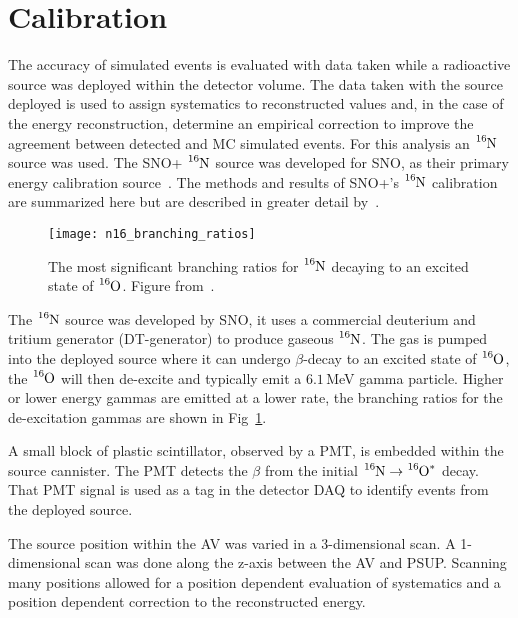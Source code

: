 \section{Calibration}
\label{sec:calib}
The accuracy of simulated events is evaluated with data taken while a
radioactive source was deployed within the detector volume.
The data taken with the source deployed is used to assign systematics to reconstructed
values and, in the case of the energy reconstruction, determine an empirical
correction to improve the agreement between detected and MC simulated events.
For this analysis an $\ce{^{16}N}$ source was used.
The SNO+ $\ce{^{16}N}$ source was developed for SNO, as
their primary energy calibration source~\citep{sno_n16}.
The methods and results of SNO+'s $\ce{^{16}N}$ calibration are summarized here but
are described in greater detail by~\citep{snop_water_unidoc}.

\begin{figure}[htbp]
\centering
\texttt{[image: n16\_branching\_ratios]}
\caption[Major $\ce{^{16}N}$ Branching Ratios]{The most significant branching ratios for $\ce{^{16}N}$ decaying
to an excited state of $\ce{^{16}O}$. Figure from~\citep{sno_n16}.}
\label{fig:n16_br}
\end{figure}
The $\ce{^{16}N}$ source was developed by SNO, it uses a commercial
deuterium and tritium generator (DT-generator) to produce gaseous $\ce{^{16}N}$.
The gas is pumped into the deployed source where it can undergo $\beta$-decay
to an excited state of $\ce{^{16}O}$, the $\ce{^{16}O}$ will then de-excite
and typically emit a $6.1$\,MeV gamma particle. Higher or lower energy gammas are emitted
at a lower rate, the branching ratios for the de-excitation gammas are shown in
Fig~\ref{fig:n16_br}.

A small block of plastic scintillator, observed by a PMT, is embedded within the
source cannister. The PMT detects the $\beta$ from the initial
$\ce{^{16}N} \rightarrow \ce{^{16}O^{*}}$ decay. That PMT signal is used as a
tag in the detector DAQ to identify events from the deployed source.

The source position within the AV was varied in a 3-dimensional
scan.
A 1-dimensional scan was done along the z-axis between the AV and PSUP\@.
Scanning many positions allowed for a position dependent evaluation of
systematics and a position dependent correction to the reconstructed energy.


